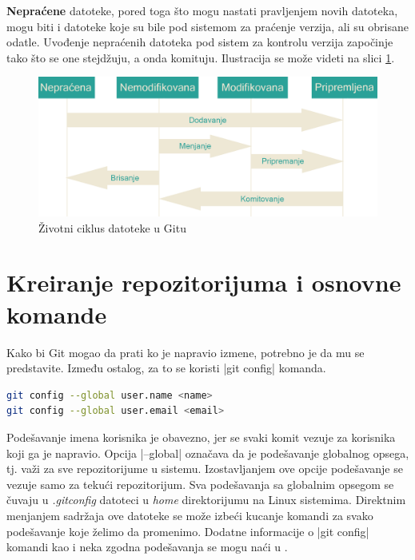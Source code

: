 \documentclass[a4paper]{article}
\begin{document}
{\textbf{Nepraćene} datoteke, pored toga što mogu nastati pravljenjem novih datoteka, mogu biti i datoteke koje su bile pod sistemom za praćenje verzija, ali su obrisane odatle. Uvođenje nepraćenih datoteka pod sistem za kontrolu verzija započinje tako što se one stejdžuju, a onda komituju.
Ilustracija se može videti na slici \ref{fig:git_lifecycle}.

\begin{figure}[h!]
\begin{center}
\includegraphics[scale=0.18]{images/lifecycle2.png}
\end{center}
\caption{Životni ciklus datoteke u Gitu}
\label{fig:git_lifecycle}
\end{figure}


\section{Kreiranje repozitorijuma i osnovne komande}
\label{sec:kreiranje}

Kako bi Git mogao da prati ko je napravio izmene, potrebno je da mu se predstavite. Između ostalog, za to se koristi  |git config| komanda.

\begin{lstlisting}[language=bash]
git config --global user.name <name>
git config --global user.email <email>
\end{lstlisting}

Podešavanje imena korisnika je obavezno, jer se svaki komit vezuje za korisnika koji ga je napravio. Opcija |--global| označava da je podešavanje globalnog opsega, tj. važi za sve repozitorijume u sistemu. Izostavljanjem ove opcije podešavanje se vezuje samo za tekući repozitorijum. Sva podešavanja sa globalnim opsegom se čuvaju u \textit{.gitconfig} datoteci u \textit{home} direktorijumu na Linux sistemima. Direktnim menjanjem sadržaja ove datoteke se može izbeći kucanje komandi za svako podešavanje koje želimo da promenimo. Dodatne informacije o |git config| komandi kao i neka zgodna podešavanja se mogu naći u \cite{progit}.

}
\end{document}
